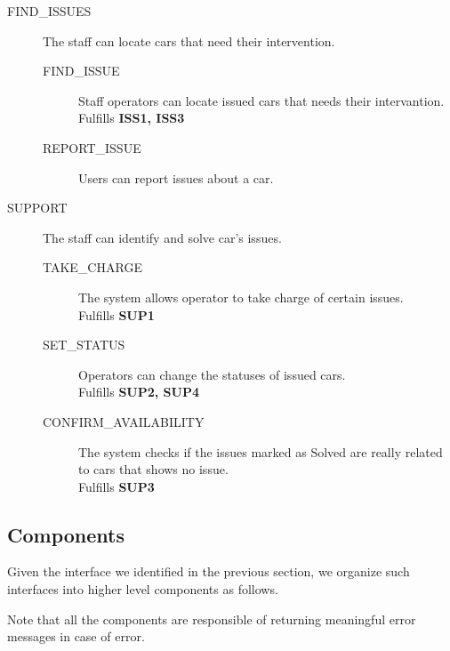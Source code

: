 \documentclass[11pt]{article} %
\begin{document}
\begin{description}
	\item[FIND\_ISSUES] The staff can locate cars that need their intervention. \hfill {\color{red}{Missing ISS2, ISS4}}
		\begin{description}
			\item[FIND\_ISSUE] Staff operators can locate issued cars that needs their intervantion. \\ Fulfills \textbf{ISS1, ISS3}
			\item[REPORT\_ISSUE] Users can report issues about a car.  {\color{red}{No matching req. found .-.}}
		\end{description}

	\item[SUPPORT] The staff can identify and solve car’s issues. \hfill {\color{red}{Add CONFIRM\_AVAILABILITY}}
		\begin{description}
			\item[TAKE\_CHARGE] The system allows operator to take charge of certain issues. \\ Fulfills \textbf{SUP1}
			\item[SET\_STATUS] Operators can change the statuses of issued cars. \\ Fulfills \textbf{SUP2, SUP4}
			\item[CONFIRM\_AVAILABILITY] The system checks if the issues marked as Solved are really related to cars that shows no issue. \\ Fulfills \textbf{SUP3}
		\end{description}
\end{description}

\subsection{Components}

Given the interface we identified in the previous section, we organize such interfaces into higher level components as follows.

Note that all the components are responsible of returning meaningful error messages in case of error.
\end{document}
